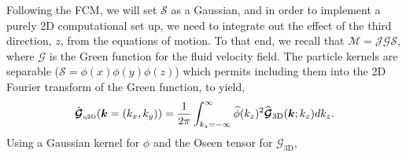 \documentclass[twoside,openright,titlepage,numbers=noenddot,%
headinclude,footinclude,cleardoublepage=empty,abstract=on,
BCOR=5mm,fontsize=11pt, dvipsnames, paper=b5
]{scrreprt}
\renewcommand{\vec}[1]{\bm{#1}}
\newcommand{\tens}[1]{\bm{\mathcal{#1}}}
\newcommand{\oper}[1]{\mathcal{#1}}
\newcommand{\fou}[1]{\widehat{#1}}
\newcommand{\qtd}{\text{\tiny q2D}}
\begin{document}
Following the \gls{FCM}, we will set $\oper{S}$ as a Gaussian, and in order to implement a purely 2D computational set up, we need to integrate out the effect of the third direction, $z$, from the equations of motion. To that end, we recall that $\tens{M} = \oper{J}\tens{G}\oper{S}$, where $\tens{G}$ is the Green function for the fluid velocity field. The particle kernels are separable ($\oper{S} = \phi(x)\phi(y)\phi(z)$) which permits including them into the 2D Fourier transform of the Green function, to yield,
\begin{equation}
  \hat{\tens{G}}_{\qtd}(\vec{k} = (k_x, k_y)) = \frac{1}{2\pi}\int_{k_z=-\infty}^\infty\fou{\phi}(k_z)^2\fou{\tens{G}}_{\text{3D}}(\vec{k};k_z)dk_z.
\end{equation}
Using a Gaussian kernel for $\phi$ and the Oseen tensor for $\tens{G}_{\text{3D}}$,
\end{document}

